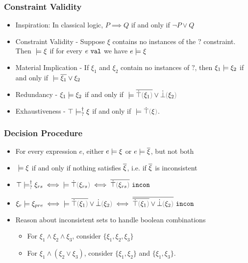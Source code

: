 \documentclass{beamer}
\begin{document}
\begin{frame}
\frametitle{Constraint Validity}
\begin{itemize}
\item Inspiration: In classical logic, $P \implies Q$ if and only if $\neg P \lor Q$
\medskip
\item Constraint Validity - Suppose $\xi$ contains no instances of the $?$ constraint. Then $\; \models \xi$ if for every $e ~\mathtt{val}$ we have $e \models \xi$
\medskip
\item Material Implication - If $\xi_1$ and $\xi_2$ contain no instances of $?$, then $\xi_1 \models \xi_2$ if and only if $\; \models \overline{\xi_1} \vee \xi_2$
\medskip
\item Redundancy - $\xi_1 \models \xi_2$ if and only if $\csatisfy{\;}{\cor{\cdual{\ctruify{\xi_1}}}{\cfalsify{\xi_2}}}$
\medskip
\item Exhaustiveness - $\top \models_{?}^{\dag} \xi$ if and only if $\csatisfy{\;}{\ctruify{\xi}}$.
\end{itemize}
\end{frame}

\begin{frame}
	\frametitle{Decision Procedure}
\begin{itemize}
\item For every expression $e$, either $e \models \xi$ or $e \models \overline{\xi}$, but not both
\medskip
\item $\; \models \xi$ if and only if nothing satisfies $\overline{\xi}$, i.e. if $\overline{\xi}$ is inconsistent
\medskip
\item $\csatisfyormay{\ctruth}{\xi_{rs}} \iff \csatisfy{\;}{\ctruify{\xi_{rs}}} \iff \cincon{\cdual{\ctruify{\xi_{rs}}}}$
\medskip
\item $\csatisfy{\xi_r}{\xi_{pre}} \iff \csatisfy{\;}{\cor{\cdual{\ctruify{\xi_1}}}{\cfalsify{\xi_2}}} \iff \cincon{\cdual{\cor{\cdual{\ctruify{\xi_1}}}{\cfalsify{\xi_2}}}}$
\bigskip
\item Reason about inconsistent sets to handle boolean combinations
\medskip 
\begin{itemize}
\item For $\xi_1 \land \xi_2 \land \xi_3$, consider $\{\xi_1, \xi_2, \xi_3 \}$
\medskip
\item For $\xi_1 \land (\xi_2 \lor \xi_3)$, consider $\{\xi_1, \xi_2\}$ and $\{\xi_1, \xi_3\}$.
\end{itemize}

\end{itemize}
\end{frame}
\end{document}
